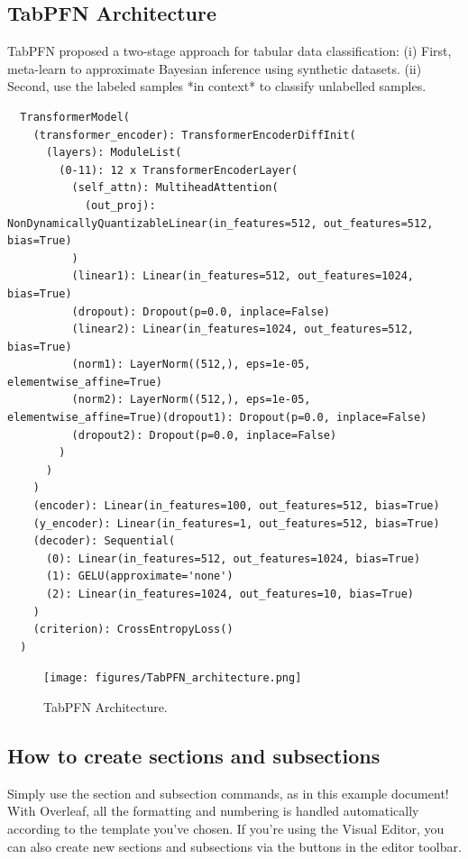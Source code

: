 \documentclass[a4paper]{article}
\begin{document}
\subsection{TabPFN Architecture}\label{subsec1}
TabPFN proposed a two-stage approach for tabular data classification: 
(i) First, meta-learn to approximate Bayesian inference using synthetic datasets. 
(ii) Second, use the labeled samples *in context* to classify unlabelled samples.

\begin{verbatim}
  TransformerModel(
    (transformer_encoder): TransformerEncoderDiffInit(
      (layers): ModuleList(
        (0-11): 12 x TransformerEncoderLayer(
          (self_attn): MultiheadAttention(
            (out_proj): NonDynamicallyQuantizableLinear(in_features=512, out_features=512, bias=True)
          )
          (linear1): Linear(in_features=512, out_features=1024, bias=True)
          (dropout): Dropout(p=0.0, inplace=False)
          (linear2): Linear(in_features=1024, out_features=512, bias=True)
          (norm1): LayerNorm((512,), eps=1e-05, elementwise_affine=True)
          (norm2): LayerNorm((512,), eps=1e-05, elementwise_affine=True)(dropout1): Dropout(p=0.0, inplace=False)
          (dropout2): Dropout(p=0.0, inplace=False)
        )
      )
    )
    (encoder): Linear(in_features=100, out_features=512, bias=True)
    (y_encoder): Linear(in_features=1, out_features=512, bias=True)
    (decoder): Sequential(
      (0): Linear(in_features=512, out_features=1024, bias=True)
      (1): GELU(approximate='none')
      (2): Linear(in_features=1024, out_features=10, bias=True)
    )
    (criterion): CrossEntropyLoss()
  )
  \end{verbatim}

\begin{figure}[!ht]
  \centering
  \texttt{[image: figures/TabPFN\_architecture.png]}
  \caption{\label{fig:TabPFN_arch} TabPFN Architecture.}
  \end{figure}
  
\subsection{How to create sections and subsections}
Simply use the section and subsection commands, as in this example document! With Overleaf, all the formatting and numbering is handled automatically according to the template you've chosen. If you're using the Visual Editor, you can also create new sections and subsections via the buttons in the editor toolbar.
\end{document}
